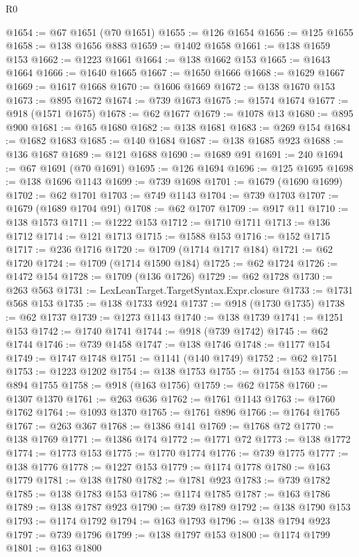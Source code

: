 \begin{lexlean}{R0}
\begin{coremodule}
@1654 := @67 @1651 (@70 @1651)
@1655 := @126 @1654
@1656 := @125 @1655
@1658 := @138 @1656 @883
@1659 := @1402 @1658
@1661 := @138 @1659 @153
@1662 := @1223 @1661
@1664 := @138 @1662 @153
@1665 := @1643 @1664
@1666 := @1640 @1665
@1667 := @1650 @1666
@1668 := @1629 @1667
@1669 := @1617 @1668
@1670 := @1606 @1669
@1672 := @138 @1670 @153
@1673 := @895 @1672
@1674 := @739 @1673
@1675 := @1574 @1674
@1677 := @918 (@1571 @1675)
@1678 := @62 @1677
@1679 := @1078 @13
@1680 := @895 @900
@1681 := @165 @1680
@1682 := @138 @1681
@1683 := @269 @154
@1684 := @1682 @1683
@1685 := @140 @1684
@1687 := @138 @1685 @923
@1688 := @136 @1687
@1689 := @121 @1688
@1690 := @1689 @91
@1691 := 240
@1694 := @67 @1691 (@70 @1691)
@1695 := @126 @1694
@1696 := @125 @1695
@1698 := @138 @1696 @1143
@1699 := @739 @1698
@1701 := @1679 (@1690 @1699)
@1702 := @62 @1701
@1703 := @749 @1143
@1704 := @739 @1703
@1707 := @1679 (@1689 @1704 @91)
@1708 := @62 @1707
@1709 := @917 @11
@1710 := @138 @1573
@1711 := @1222 @153
@1712 := @1710 @1711
@1713 := @136 @1712
@1714 := @121 @1713
@1715 := @1588 @153
@1716 := @152 @1715
@1717 := @236 @1716
@1720 := @1709 (@1714 @1717 @184)
@1721 := @62 @1720
@1724 := @1709 (@1714 @1590 @184)
@1725 := @62 @1724
@1726 := @1472 @154
@1728 := @1709 (@136 @1726)
@1729 := @62 @1728
@1730 := @263 @563
@1731 := LexLeanTarget.TargetSyntax.Expr.closure
@1733 := @1731 @568 @153
@1735 := @138 @1733 @924
@1737 := @918 (@1730 @1735)
@1738 := @62 @1737
@1739 := @1273 @1143
@1740 := @138 @1739
@1741 := @1251 @153
@1742 := @1740 @1741
@1744 := @918 (@739 @1742)
@1745 := @62 @1744
@1746 := @739 @1458
@1747 := @138 @1746
@1748 := @1177 @154
@1749 := @1747 @1748
@1751 := @1141 (@140 @1749)
@1752 := @62 @1751
@1753 := @1223 @1202
@1754 := @138 @1753
@1755 := @1754 @153
@1756 := @894 @1755
@1758 := @918 (@163 @1756)
@1759 := @62 @1758
@1760 := @1307 @1370
@1761 := @263 @636
@1762 := @1761 @1143
@1763 := @1760 @1762
@1764 := @1093 @1370
@1765 := @1761 @896
@1766 := @1764 @1765
@1767 := @263 @367
@1768 := @1386 @141
@1769 := @1768 @72
@1770 := @138 @1769
@1771 := @1386 @174
@1772 := @1771 @72
@1773 := @138 @1772
@1774 := @1773 @153
@1775 := @1770 @1774
@1776 := @739 @1775
@1777 := @138 @1776
@1778 := @1227 @153
@1779 := @1174 @1778
@1780 := @163 @1779
@1781 := @138 @1780
@1782 := @1781 @923
@1783 := @739 @1782
@1785 := @138 @1783 @153
@1786 := @1174 @1785
@1787 := @163 @1786
@1789 := @138 @1787 @923
@1790 := @739 @1789
@1792 := @138 @1790 @153
@1793 := @1174 @1792
@1794 := @163 @1793
@1796 := @138 @1794 @923
@1797 := @739 @1796
@1799 := @138 @1797 @153
@1800 := @1174 @1799
@1801 := @163 @1800

\end{coremodule}
\end{lexlean}

